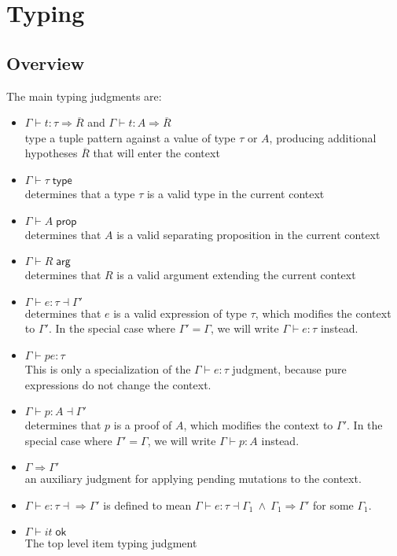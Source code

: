 \documentclass[acmsmall,nonacm]{acmart}
\newcommand{\proves}{\vdash}
\newcommand{\makes}{\dashv}
\newcommand{\constep}{\Rightarrow}
\newcommand{\makesto}{\dashv\!\constep}
\begin{document}
\section{Typing}

\subsection{Overview}

The main typing judgments are:

\begin{itemize}
  \item $\Gamma \proves t:\tau \Rightarrow \overline{R}$ and $\Gamma \proves t:A\Rightarrow \overline{R}$\\ type a tuple pattern against a value of type $\tau$ or $A$, producing additional hypotheses $\overline{R}$ that will enter the context
  \item $\Gamma \proves \tau\;\mathsf{type}$\\ determines that a type $\tau$ is a valid type in the current context
  \item $\Gamma \proves A\;\mathsf{prop}$\\ determines that $A$ is a valid separating proposition in the current context
  \item $\Gamma \proves R\;\mathsf{arg}$\\ determines that $R$ is a valid argument extending the current context
  \item $\Gamma \proves e:\tau \makes\Gamma'$\\ determines that $e$ is a valid expression of type $\tau$, which modifies the context to $\Gamma'$. In the special case where $\Gamma'=\Gamma$, we will write $\Gamma \proves e:\tau$ instead.
  \item $\Gamma \proves pe:\tau$\\ This is only a specialization of the $\Gamma \proves e:\tau$ judgment, because pure expressions do not change the context.
  \item $\Gamma \proves p:A \makes\Gamma'$\\ determines that $p$ is a proof of $A$, which modifies the context to $\Gamma'$. In the special case where $\Gamma'=\Gamma$, we will write $\Gamma \proves p:A$ instead.
  \item $\Gamma \constep \Gamma'$\\ an auxiliary judgment for applying pending mutations to the context.
  \item $\Gamma \proves e:\tau\makesto\Gamma'$ is defined to mean $\Gamma \proves e:\tau\makes\Gamma_1\ \wedge\ \Gamma_1\constep\Gamma'$ for some $\Gamma_1$.
  \item $\Gamma\proves it\;\mathsf{ok}$\\ The top level item typing judgment
\end{itemize}
\end{document}
